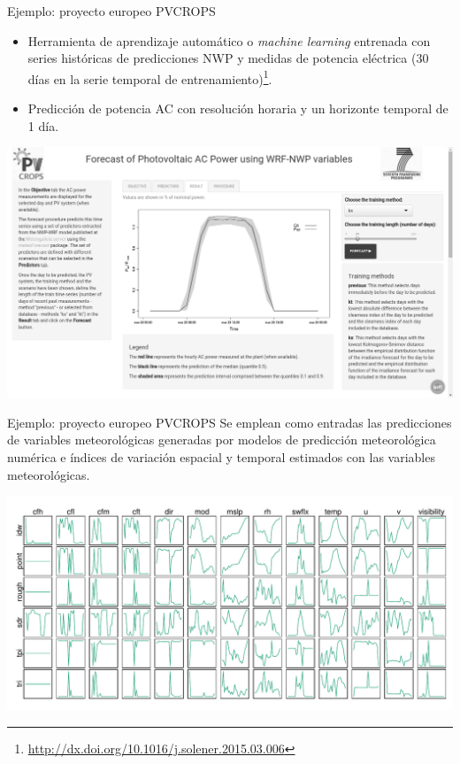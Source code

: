 \documentclass[aspectratio=169, usenames,svgnames,dvipsnames]{beamer}
\begin{document}
\begin{frame}[label={sec:orgc34868b}]{Ejemplo: proyecto europeo PVCROPS}
\begin{itemize}
\item Herramienta de aprendizaje automático o \emph{machine learning}
entrenada con series históricas de predicciones NWP y medidas de
potencia eléctrica (30 días en la serie temporal de
entrenamiento)\footnote{\url{http://dx.doi.org/10.1016/j.solener.2015.03.006}}.
\item Predicción de potencia AC con resolución horaria y un horizonte
temporal de 1 día.
\end{itemize}


\begin{center}
\includegraphics[height=0.6\textheight]{../figs/ForecastShiny.png}
\end{center}
\end{frame}

\begin{frame}[label={sec:org688684d}]{Ejemplo: proyecto europeo PVCROPS}
Se emplean como entradas las predicciones de variables
meteorológicas generadas por modelos de predicción meteorológica
numérica e índices de variación espacial y temporal estimados con
las variables meteorológicas.

\begin{center}
\includegraphics[height=0.7\textheight]{../figs/varsComplete.pdf}
\end{center}
\end{frame}
\end{document}

